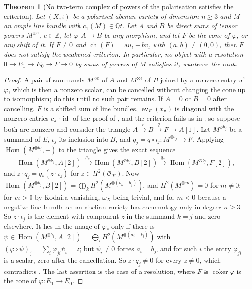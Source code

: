 \documentclass[11pt,reqno]{amsart}
\theoremstyle{plain}
\newtheorem{theorem}{Theorem}[section]
\theoremstyle{definition}
\theoremstyle{remark}
\newcommand{\QQ}{\mathbb{Q}}
\newcommand{\ZZ}{\mathbb{Z}}
\newcommand{\cO}{\mathcal{O}}
\DeclareMathOperator{\ch}{ch}
\DeclareMathOperator{\Hom}{Hom}
\DeclareMathOperator{\coker}{coker}
\DeclareMathOperator{\id}{id}
\begin{document}
\begin{theorem}[No two-term complex of powers of the polarisation satisfies
the criterion]\label{thm:nosplit}
Let $(X,t)$ be a polarised abelian variety of dimension $n\ge3$ and $M$ an
ample line bundle with $c_{1}(M)\in\QQ t$. Let $A$ and $B$ be direct sums of
tensor powers $M^{\otimes e}$, $e\in\ZZ$, let $\varphi\colon A\to B$ be any
morphism, and let $F$ be the cone of $\varphi$, or any shift of it. If $F\ne0$
and $\ch(F)=au_{t}+bv_{t}$ with $(a,b)\ne(0,0)$, then $F$ does not satisfy
the weakened criterion. In particular, no object with a resolution
$0\to E_{1}\to E_{0}\to F\to0$ by sums of powers of $M$ satisfies it,
whatever the rank.
\end{theorem}

\begin{proof}
A pair of summands $M^{\otimes e}$ of $A$ and $M^{\otimes e}$ of $B$ joined
by a nonzero entry of $\varphi$, which is then a nonzero scalar, can be
cancelled without changing the cone up to isomorphism; do this until no such
pair remains. If $A=0$ or $B=0$ after cancelling, $F$ is a shifted sum of
line bundles, $\operatorname{ev}_{F}(x_{\pi})$ is diagonal with the nonzero
entries $c_{\pi}\cdot\id$ of the proof of , and the
criterion fails as in ; so suppose both are nonzero and
consider the triangle $A\xrightarrow{\varphi}B\xrightarrow{\;q\;}F\to A[1]$.
Let $M^{\otimes b_{j}}$ be a summand of $B$, $\iota_{j}$ its inclusion into
$B$, and $q_{j}=q\circ\iota_{j}\colon M^{\otimes b_{j}}\to F$. Applying
$\Hom(M^{\otimes b_{j}},-)$ to the triangle gives the exact sequence
\[
  \Hom(M^{\otimes b_{j}},A[2])\xrightarrow{\;\varphi_{*}\;}
  \Hom(M^{\otimes b_{j}},B[2])\xrightarrow{\;q_{*}\;}
  \Hom(M^{\otimes b_{j}},F[2]),
\]
and $z\cdot q_{j}=q_{*}(z\cdot\iota_{j})$ for $z\in H^{2}(\cO_{X})$. Now
$\Hom(M^{\otimes b_{j}},B[2])=\bigoplus_{k}H^{2}(M^{\otimes(b_{k}-b_{j})})$,
and $H^{2}(M^{\otimes m})=0$ for $m\ne0$: for $m>0$ by Kodaira vanishing,
$\omega_{X}$ being trivial, and for $m<0$ because a negative line bundle on
an abelian variety has cohomology only in degree $n\ge3$. So $z\cdot\iota_{j}$
is the element with component $z$ in the summand $k=j$ and zero elsewhere. It
lies in the image of $\varphi_{*}$ only if there is
$\psi\in\Hom(M^{\otimes b_{j}},A[2])=\bigoplus_{i}H^{2}(M^{\otimes(a_{i}-b_{j})})$
with $(\varphi\circ\psi)_{j}=\sum_{i}\varphi_{ji}\psi_{i}=z$; but $\psi_{i}\ne0$
forces $a_{i}=b_{j}$, and for such $i$ the entry $\varphi_{ji}$ is a scalar,
zero after the cancellation. So $z\cdot q_{j}\ne0$ for every $z\ne0$, which
contradicts . The last assertion is the case of a
resolution, where $F\cong\coker\varphi$ is the cone of $\varphi\colon E_{1}\to E_{0}$.
\end{proof}
\end{document}
